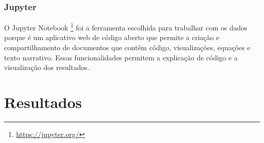 










 

\subsection{Jupyter}

O Jupyter Notebook \footnote{\href{https://jupyter.org/}{https://jupyter.org/}} foi a ferramenta escolhida para trabalhar com os dados porque é um aplicativo web de código aberto que permite a criação e compartilhamento de documentos que contêm código, visualizações, equações e texto narrativo. Essas funcionalidades permitem a explicação de código e a visualização dos resultados.






\chapter{Resultados}
\label{chap:5}


